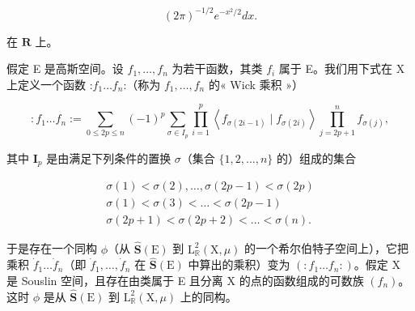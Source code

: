 \[
(2 \pi) ^ {- 1 / 2} e ^ {- x ^ {2} / 2} d x.
\]

在 \(\mathbf{R}\) 上。

假定 E 是高斯空间。设 \(f_1, \ldots, f_n\) 为若干函数，其类 \(f_i\) 属于 E。我们用下式在 X 上定义一个函数 :\(f_1 \ldots f_n\):（称为 \(f_1, \ldots, f_n\) 的« Wick 乘积 »）

\[
: f _ {1} \dots f _ {n} := \sum_ {0 \leqslant 2 p \leqslant n} (- 1) ^ {p} \sum_ {\sigma \in I _ {p}} \prod_ {i = 1} ^ {p} \left\langle f _ {\sigma (2 i - 1)} \mid f _ {\sigma (2 i)} \right\rangle \prod_ {j = 2 p + 1} ^ {n} f _ {\sigma (j)},\tag{23}
\]

其中 \(\mathbf{I}_p\) 是由满足下列条件的置换 \(\sigma\)（集合 \(\{1,2,\dots,n\}\) 的）组成的集合

\[
\begin{array}{l} \sigma (1) <   \sigma (2), \dots , \sigma (2 p - 1) <   \sigma (2 p) \\ \sigma (1) <   \sigma (3) <   \dots <   \sigma (2 p - 1) \\ \sigma (2 p + 1) <   \sigma (2 p + 2) <   \dots <   \sigma (n). \end{array}
\]

于是存在一个同构 \(\phi\)（从 \(\hat{\mathbf{S}}(\mathrm{E})\) 到 \(\mathrm{L}_{\mathbb{R}}^{2}(\mathrm{X},\mu)\) 的一个希尔伯特子空间上），它把乘积 \(\dot{f}_1\dots \dot{f}_n\)（即 \(\dot{f}_1,\dots ,\dot{f}_n\) 在 \(\hat{\mathbf{S}}(\mathrm{E})\) 中算出的乘积）变为 \((:f_1\dots f_n:)\)。假定 X 是 Souslin 空间，且存在由类属于 E 且分离 X 的点的函数组成的可数族 \((f_{n})\)。这时 \(\phi\) 是从 \(\hat{\mathbf{S}}(\mathrm{E})\) 到 \(\mathrm{L}_{\mathbb{R}}^{2}(\mathrm{X},\mu)\) 上的同构。

